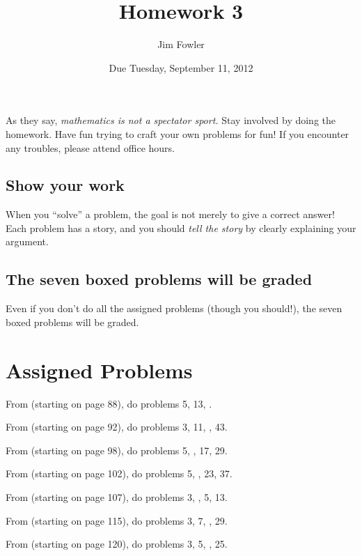 \documentclass[12pt]{handout}
\title{Homework 3}
\date{Due Tuesday, September 11, 2012}
\author{Jim Fowler}
\begin{document}
\maketitle



As they say, \textit{mathematics is not a spectator sport.}  Stay involved by doing the homework.  Have fun trying to craft your own problems for fun!  If you encounter any troubles, please attend office hours.





\subsection*{Show your work}
When you ``solve'' a problem, the goal is not merely to give a correct answer!  Each problem has a story, and you should \textit{tell the story} by clearly explaining your argument.


\subsection*{The seven boxed problems will be graded}
Even if you don't do all the assigned problems (though you should!), the seven boxed problems will be graded.

\section*{Assigned Problems}

From  (starting on page 88),
do problems 5, 13, .
\vspace{1ex}

From  (starting on page 92),
do problems 3, 11, , 43.
\vspace{1ex}

From  (starting on page 98),
do problems 5, , 17, 29.
\vspace{1ex}

From  (starting on page 102),
do problems 5, , 23, 37.
\vspace{1ex}

From  (starting on page 107),
do problems 3, , 5, 13.
\vspace{1ex}

From  (starting on page 115),
do problems 3, 7, , 29.
\vspace{1ex}

From  (starting on page 120),
do problems 3, 5, , 25.
\vspace{1ex}
\end{document}
